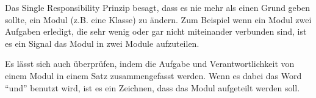 Das Single Responsibility Prinzip besagt, dass es nie mehr als einen Grund geben sollte,
ein Modul (z.B. eine Klasse) zu ändern. Zum Beispiel wenn ein Modul zwei Aufgaben erledigt, die sehr wenig 
oder gar nicht miteinander verbunden sind, ist es ein Signal das Modul in zwei Module aufzuteilen.

Es lässt sich auch überprüfen, indem die Aufgabe und Verantwortlichkeit von einem Modul 
in einem Satz zusammengefasst werden. Wenn es dabei das Word ``und'' benutzt wird, ist es ein Zeichnen, dass
das Modul aufgeteilt werden soll.



